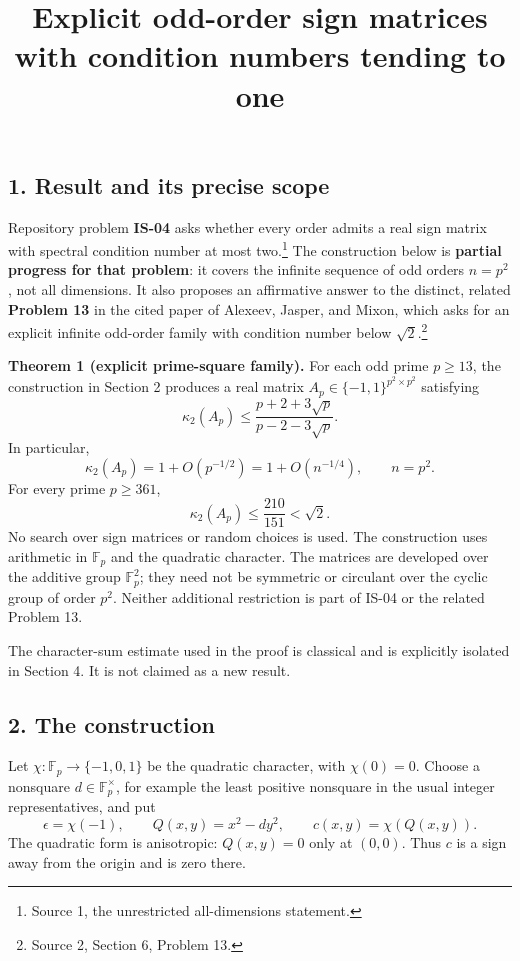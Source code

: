 \documentclass[
  11pt,
]{article}
\title{Explicit odd-order sign matrices with condition numbers tending
to one}
\author{}
\date{}
\begin{document}
\maketitle

\subsection{1. Result and its precise
scope}\label{result-and-its-precise-scope}

Repository problem \textbf{IS-04} asks whether every order admits a real
sign matrix with spectral condition number at most two.\footnote{Source
  1, the unrestricted all-dimensions statement.} The construction below
is \textbf{partial progress for that problem}: it covers the infinite
sequence of odd orders \(n=p^2\), not all dimensions. It also proposes
an affirmative answer to the distinct, related \textbf{Problem 13} in
the cited paper of Alexeev, Jasper, and Mixon, which asks for an
explicit infinite odd-order family with condition number below
\(\sqrt2\).\footnote{Source 2, Section 6, Problem 13.}

\textbf{Theorem 1 (explicit prime-square family).} For each odd prime
\(p\geq13\), the construction in Section 2 produces a real matrix
\(A_p\in\{-1,1\}^{p^2\times p^2}\) satisfying \[
\kappa_2(A_p)
\leq\frac{p+2+3\sqrt p}{p-2-3\sqrt p}. \tag{1}
\] In particular, \[
\kappa_2(A_p)=1+O(p^{-1/2})=1+O(n^{-1/4}),\qquad n=p^2.
\] For every prime \(p\geq361\), \[
\kappa_2(A_p)\leq\frac{210}{151}<\sqrt2. \tag{2}
\] No search over sign matrices or random choices is used. The
construction uses arithmetic in \(\mathbb F_p\) and the quadratic
character. The matrices are developed over the additive group
\(\mathbb F_p^2\); they need not be symmetric or circulant over the
cyclic group of order \(p^2\). Neither additional restriction is part of
IS-04 or the related Problem 13.

The character-sum estimate used in the proof is classical and is
explicitly isolated in Section 4. It is not claimed as a new result.

\subsection{2. The construction}\label{the-construction}

Let \(\chi:\mathbb F_p\to\{-1,0,1\}\) be the quadratic character, with
\(\chi(0)=0\). Choose a nonsquare \(d\in\mathbb F_p^\times\), for
example the least positive nonsquare in the usual integer
representatives, and put \[
\epsilon=\chi(-1),\qquad Q(x,y)=x^2-dy^2,
\qquad c(x,y)=\chi(Q(x,y)).
\] The quadratic form is anisotropic: \(Q(x,y)=0\) only at \((0,0)\).
Thus \(c\) is a sign away from the origin and is zero there.
\end{document}
